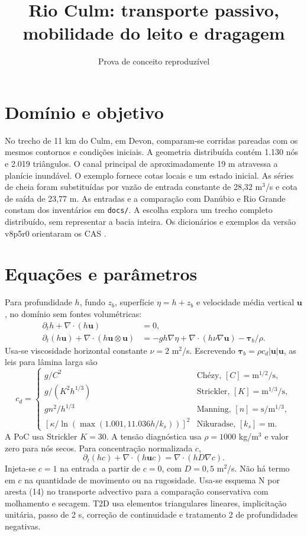 \documentclass[11pt,a4paper]{article}
\title{Rio Culm: transporte passivo, mobilidade do leito e dragagem}
\author{Prova de conceito reproduzível}
\date{}
\begin{document}
\maketitle
\section{Domínio e objetivo}
No trecho de 11 km do Culm, em Devon, comparam-se corridas pareadas com os mesmos contornos e condições iniciais. A geometria distribuída contém 1.130 nós e 2.019 triângulos. O canal principal de aproximadamente 19 m atravessa a planície inundável. O exemplo fornece cotas locais e um estado inicial. As séries de cheia foram substituídas por vazão de entrada constante de 28,32 m$^3$/s e cota de saída de 23,77 m. As entradas e a comparação com Danúbio e Rio Grande constam dos inventários em \texttt{docs/}. A escolha explora um trecho completo distribuído, sem representar a bacia inteira. Os dicionários e exemplos da versão v8p5r0 orientaram os CAS \cite{telemac}.
\section{Equações e parâmetros}
Para profundidade $h$, fundo $z_b$, superfície $\eta=h+z_b$ e velocidade média vertical $\mathbf u$, no domínio sem fontes volumétricas:
\begin{align}
\partial_t h+\nabla\cdot(h\mathbf u)&=0,\\
\partial_t(h\mathbf u)+\nabla\cdot(h\mathbf u\otimes\mathbf u)
&=-gh\nabla\eta+\nabla\cdot(h\nu\nabla\mathbf u)-\boldsymbol\tau_b/\rho .
\end{align}
Usa-se viscosidade horizontal constante $\nu=2$ m$^2$/s. Escrevendo $\boldsymbol\tau_b=\rho c_d |\mathbf u|\mathbf u$, as leis para lâmina larga são
\[
c_d=\begin{cases}
g/C^2 &\text{Chézy, }[C]=\mathrm{m}^{1/2}/\mathrm{s},\\
g/(K^2 h^{1/3})&\text{Strickler, }[K]=\mathrm{m}^{1/3}/\mathrm{s},\\
g n^2/h^{1/3}&\text{Manning, }[n]=\mathrm{s}/\mathrm{m}^{1/3},\\
[\kappa/\ln(\max(1.001,11.036h/k_s))]^2&\text{Nikuradse, }[k_s]=\mathrm{m}.
\end{cases}
\]
A PoC usa Strickler $K=30$. A tensão diagnóstica usa $\rho=1000$ kg/m$^3$ e valor zero para nós secos. Para concentração normalizada $c$,
\[
\partial_t(hc)+\nabla\cdot(h\mathbf u c)=\nabla\cdot(hD\nabla c).
\]
Injeta-se $c=1$ na entrada a partir de $c=0$, com $D=0,5$ m$^2$/s. Não há termo em $c$ na quantidade de movimento ou na rugosidade. Usa-se esquema N por aresta (14) no transporte advectivo para a comparação conservativa com molhamento e secagem. T2D usa elementos triangulares lineares, implicitação unitária, passo de 2 s, correção de continuidade e tratamento 2 de profundidades negativas.
\end{document}
